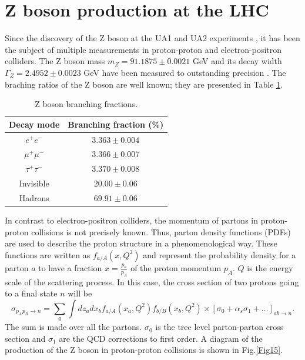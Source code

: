 \section{Z boson production at the LHC}\label{chap2sec0}
Since the discovery of the Z boson at the UA1 and UA2 experiments \cite{Arnison:1983rp,Arnison:1983mk,Banner:1983jy,Bagnaia:1983zx}, it has been the subject of multiple measurements in proton-proton and electron-positron colliders. The Z boson mass $m_Z=91.1875\pm0.0021$ GeV and its decay width $\Gamma_Z=2.4952\pm0.0023$ GeV have been measured to outstanding precision \cite{ALEPH:2005ab}. The braching ratios of the Z boson are well known; they are presented in Table \ref{Table0}.
\begin{table}[]
	\centering
	\begin{tabular}{cc}
		\hline
		\multicolumn{1}{|c|}{Decay mode} & \multicolumn{1}{c|}{Branching fraction (\%)} \\ \hline
		$e^+e^-$                         & $3.363\pm0.004$                              \\
		$\mu^+\mu^-$                     & $3.366\pm0.007$                              \\
		$\tau^+\tau^-$                   & $3.370\pm0.008$                              \\
		Invisible                        & $20.00\pm0.06$                               \\
		Hadrons                          & $69.91\pm0.06$                               \\ \hline
	\end{tabular}
	\caption{Z boson branching fractions.}
	\label{Table0}
\end{table}
In contrast to electron-positron colliders, the momentum of partons in proton-proton collisions is not precisely known. Thus, parton density functions (PDFs) are used to describe the proton structure in a phenomenological way. These functions are written as $f_{a/A}(x,Q^2)$ and represent the probability density for a parton $a$ to have a fraction $x=\frac{p_a}{p_A}$ of the proton momentum $p_A$. $Q$ is the energy scale of the scattering process. In this case, the cross section of two protons going to a final state $n$ will be
\begin{equation}
	\sigma_{p_Ap_B\to n}=\sum_{q}\int dz_adx_b f_{a/A}(x_a,Q^2) f_{b/B}(x_b,Q^2)\times [\sigma_0+\alpha_s\sigma_1+\dots]_{ab\to n}.
\end{equation}
The sum is made over all the partons. $\sigma_0$ is the tree level parton-parton cross section and $\sigma_1$ are the QCD corrections to first order. A diagram of the production of the Z boson in proton-proton collisions is shown in Fig.\ref{Fig15}. 
